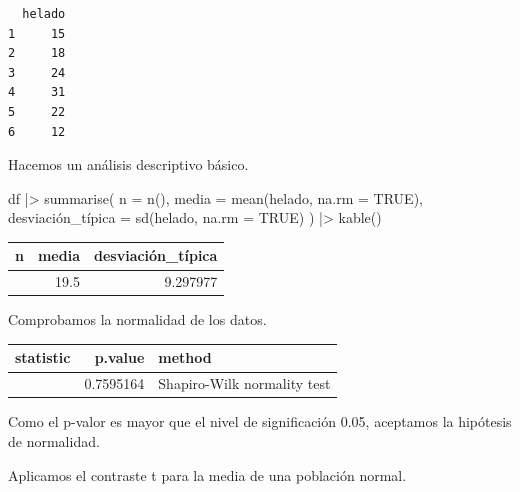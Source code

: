 \documentclass[
  a4paper,
]{scrreport}
\newenvironment{Shaded}{\begin{snugshade}}{\end{snugshade}}
\newcommand{\AttributeTok}[1]{\textcolor[rgb]{0.40,0.45,0.13}{#1}}
\newcommand{\ConstantTok}[1]{\textcolor[rgb]{0.56,0.35,0.01}{#1}}
\newcommand{\FunctionTok}[1]{\textcolor[rgb]{0.28,0.35,0.67}{#1}}
\newcommand{\NormalTok}[1]{\textcolor[rgb]{0.00,0.23,0.31}{#1}}
\newcommand{\OtherTok}[1]{\textcolor[rgb]{0.00,0.23,0.31}{#1}}
\newcommand{\SpecialCharTok}[1]{\textcolor[rgb]{0.37,0.37,0.37}{#1}}
\theoremstyle{definition}
\theoremstyle{remark}
\begin{document}
\begin{tcolorbox}
\begin{verbatim}
  helado
1     15
2     18
3     24
4     31
5     22
6     12
\end{verbatim}

Hacemos un análisis descriptivo básico.

\begin{Shaded}
\begin{Highlighting}[]
\NormalTok{df }\SpecialCharTok{|\textgreater{}} 
    \FunctionTok{summarise}\NormalTok{(}
        \AttributeTok{n =} \FunctionTok{n}\NormalTok{(),}
        \AttributeTok{media =} \FunctionTok{mean}\NormalTok{(helado, }\AttributeTok{na.rm =} \ConstantTok{TRUE}\NormalTok{),}
\NormalTok{        desviación\_típica }\OtherTok{=} \FunctionTok{sd}\NormalTok{(helado, }\AttributeTok{na.rm =} \ConstantTok{TRUE}\NormalTok{)}
\NormalTok{    ) }\SpecialCharTok{|\textgreater{}} 
    \FunctionTok{kable}\NormalTok{()}
\end{Highlighting}
\end{Shaded}

\begin{longtable}[]{@{}rrr@{}}
\toprule\noalign{}
n & media & desviación\_típica \\
\midrule\noalign{}
\endhead
\bottomrule\noalign{}
\endlastfoot
22 & 19.5 & 9.297977 \\
\end{longtable}

Comprobamos la normalidad de los datos.

\begin{Shaded}
\end{Shaded}

\begin{longtable}[]{@{}rrl@{}}
\toprule\noalign{}
statistic & p.value & method \\
\midrule\noalign{}
\endhead
\bottomrule\noalign{}
\endlastfoot
0.9721157 & 0.7595164 & Shapiro-Wilk normality test \\
\end{longtable}

Como el p-valor es mayor que el nivel de significación 0.05, aceptamos
la hipótesis de normalidad.

Aplicamos el contraste t para la media de una población normal.


\end{tcolorbox}
\end{document}
